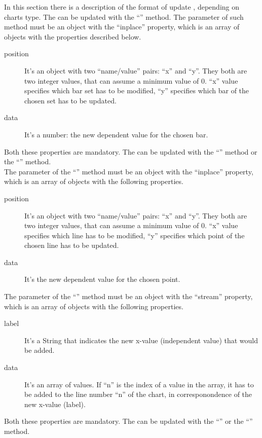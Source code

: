 			In this section there is a description of the format of update , depending on charts type. 
				The  can be updated with the “” method. The parameter of such method must be an object with the “inplace” property, which is an array of objects with the properties described below.
				\begin{description}
					\item[position] It's an object with two “name/value” pairs: “x” and “y”. They both are two integer values, that can assume a minimum value of 0. “x” value specifies which bar set has to be modified, “y” specifies which bar of the chosen set has to be updated.
					\item[data] It's a number: the new dependent value for the chosen bar.
				\end{description}
				Both these properties are mandatory.
				The  can be updated with the “” method or the “” method.\\
				The parameter of the “” method must be an object with the “inplace” property, which is an array of objects with the following properties.
				\begin{description}
					\item[position] It's an object with two “name/value” pairs: “x” and “y”. They both are two integer values, that can assume a minimum value of 0. “x” value specifies which line has to be modified, “y” specifies which point of the chosen line has to be updated.
					\item[data] It's the new dependent value for the chosen point.
				\end{description}
				The parameter of the “” method must be an object with the “stream” property, which is an array of objects with the following properties.
				\begin{description}
					\item[label] It's a String that indicates the new x-value (independent value) that would be added.
					\item[data] It's an array of values. If “n” is the index of a value in the array, it has to be added to the line number “n” of the chart, in corresponondence of the new x-value (label).
				\end{description}
				Both these properties are mandatory.
				The  can be updated with the “” or the “” method.\\
